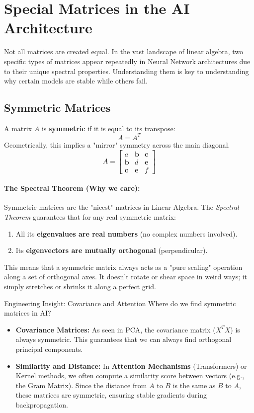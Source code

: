 \section{Special Matrices in the AI Architecture}

Not all matrices are created equal. In the vast landscape of linear algebra, two specific types of matrices appear repeatedly in Neural Network architectures due to their unique spectral properties. Understanding them is key to understanding why certain models are stable while others fail.

\subsection{Symmetric Matrices}

A matrix $A$ is \textbf{symmetric} if it is equal to its transpose:
\[ A = A^T \]
Geometrically, this implies a "mirror" symmetry across the main diagonal.
$$A = \begin{bmatrix}
a &  \textbf{b} & \textbf{c} \\
\textbf{b} & d & \textbf{e} \\
\textbf{c} & \textbf{e} & f
\end{bmatrix}$$

\paragraph{The Spectral Theorem (Why we care):}
Symmetric matrices are the "nicest" matrices in Linear Algebra. The \textit{Spectral Theorem} guarantees that for any real symmetric matrix:
\begin{enumerate}
    \item All its \textbf{eigenvalues are real numbers} (no complex numbers involved).
    \item Its \textbf{eigenvectors are mutually orthogonal} (perpendicular).
\end{enumerate}

This means that a symmetric matrix always acts as a "pure scaling" operation along a set of orthogonal axes. It doesn't rotate or shear space in weird ways; it simply stretches or shrinks it along a perfect grid.

\begin{unibobox}{Engineering Insight: Covariance and Attention}
Where do we find symmetric matrices in AI?
\begin{itemize}
    \item \textbf{Covariance Matrices:} As seen in PCA, the covariance matrix ($X^T X$) is always symmetric. This guarantees that we can always find orthogonal principal components.
    \item \textbf{Similarity and Distance:} In \textbf{Attention Mechanisms} (Transformers) or Kernel methods, we often compute a similarity score between vectors (e.g., the Gram Matrix). Since the distance from $A$ to $B$ is the same as $B$ to $A$, these matrices are symmetric, ensuring stable gradients during backpropagation.
\end{itemize}
\end{unibobox}

